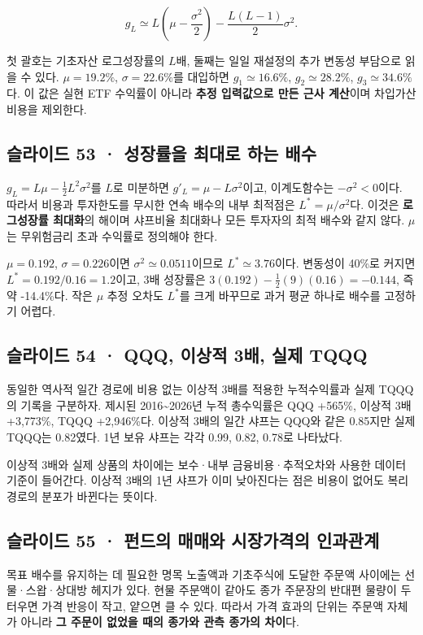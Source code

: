 \documentclass[11pt,a4paper]{article}
\begin{document}
\[
g_L\simeq L\left(\mu-\frac{\sigma^2}{2}\right)
-\frac{L(L-1)}{2}\sigma^2.
\]

첫 괄호는 기초자산 로그성장률의 $L$배, 둘째는 일일 재설정의 추가 변동성 부담으로 읽을 수 있다. $\mu=19.2\%$, $\sigma=22.6\%$를 대입하면 $g_1\simeq16.6\%$, $g_2\simeq28.2\%$, $g_3\simeq34.6\%$다. 이 값은 실현 ETF 수익률이 아니라 \textbf{추정 입력값으로 만든 근사 계산}이며 차입가산비용을 제외한다.\par

\subsection{슬라이드 53 · 성장률을 최대로 하는 배수}
$g_L=L\mu-\tfrac12L^2\sigma^2$를 $L$로 미분하면 $g'_L=\mu-L\sigma^2$이고, 이계도함수는 $-\sigma^2<0$이다. 따라서 비용과 투자한도를 무시한 연속 배수의 내부 최적점은 $L^*=\mu/\sigma^2$다. 이것은 \textbf{로그성장률 최대화}의 해이며 샤프비율 최대화나 모든 투자자의 최적 배수와 같지 않다. $\mu$는 무위험금리 초과 수익률로 정의해야 한다.\par

$\mu=0.192$, $\sigma=0.226$이면 $\sigma^2\simeq0.0511$이므로 $L^*\simeq3.76$이다. 변동성이 40\%로 커지면 $L^*=0.192/0.16=1.2$이고, 3배 성장률은 $3(0.192)-\tfrac12(9)(0.16)=-0.144$, 즉 약 -14.4\%다. 작은 $\mu$ 추정 오차도 $L^*$를 크게 바꾸므로 과거 평균 하나로 배수를 고정하기 어렵다.\par

\subsection{슬라이드 54 · QQQ, 이상적 3배, 실제 TQQQ}
동일한 역사적 일간 경로에 비용 없는 이상적 3배를 적용한 누적수익률과 실제 TQQQ의 기록을 구분하자. 제시된 2016\~{}2026년 누적 총수익률은 QQQ +565\%, 이상적 3배 +3,773\%, TQQQ +2,946\%다. 이상적 3배의 일간 샤프는 QQQ와 같은 0.85지만 실제 TQQQ는 0.82였다. 1년 보유 샤프는 각각 0.99, 0.82, 0.78로 나타났다.\par

이상적 3배와 실제 상품의 차이에는 보수·내부 금융비용·추적오차와 사용한 데이터 기준이 들어간다. 이상적 3배의 1년 샤프가 이미 낮아진다는 점은 비용이 없어도 복리 경로의 분포가 바뀐다는 뜻이다.\par

\subsection{슬라이드 55 · 펀드의 매매와 시장가격의 인과관계}
목표 배수를 유지하는 데 필요한 명목 노출액과 기초주식에 도달한 주문액 사이에는 선물·스왑·상대방 헤지가 있다. 현물 주문액이 같아도 종가 주문장의 반대편 물량이 두터우면 가격 반응이 작고, 얕으면 클 수 있다. 따라서 가격 효과의 단위는 주문액 자체가 아니라 \textbf{그 주문이 없었을 때의 종가와 관측 종가의 차이}다.\par
\end{document}
